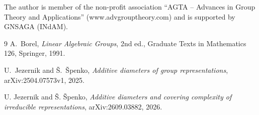 \documentclass[11pt]{article}
\theoremstyle{remark}
\begin{document}
The author is member of the non-profit association ``AGTA -- Advances in
Group Theory and Applications'' (www.advgrouptheory.com) and is supported by GNSAGA (INdAM).

\begin{thebibliography}{9}
A.~Borel,
\emph{Linear Algebraic Groups},
2nd ed., Graduate Texts in Mathematics 126, Springer, 1991.


U.~Jezernik and \v{S}.~\v{S}penko,
\emph{Additive diameters of group representations},
arXiv:2504.07573v1, 2025.

U. Jezernik and Š. Špenko,
\textit{Additive diameters and covering complexity of irreducible representations},
arXiv:2609.03882, 2026.

\end{thebibliography}
\end{document}
